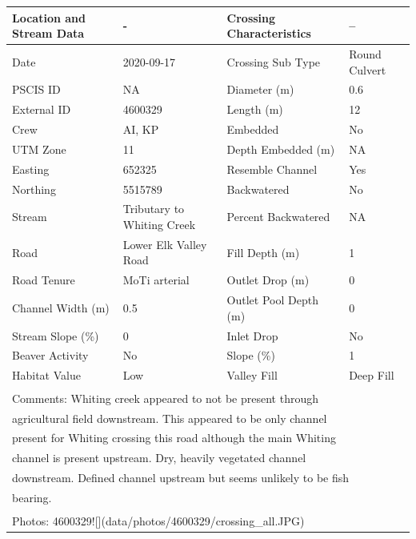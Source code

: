 \documentclass[
]{book}
\begin{document}
\begin{tabular}{l|l|l|l}
\hline
Location and Stream Data & - & Crossing Characteristics & --\\
\hline
Date & 2020-09-17 & Crossing Sub Type & Round Culvert\\
\hline
PSCIS ID & NA & Diameter (m) & 0.6\\
\hline
External ID & 4600329 & Length (m) & 12\\
\hline
Crew & AI, KP & Embedded & No\\
\hline
UTM Zone & 11 & Depth Embedded (m) & NA\\
\hline
Easting & 652325 & Resemble Channel & Yes\\
\hline
Northing & 5515789 & Backwatered & No\\
\hline
Stream & Tributary to Whiting Creek & Percent Backwatered & NA\\
\hline
Road & Lower Elk Valley Road & Fill Depth (m) & 1\\
\hline
Road Tenure & MoTi arterial & Outlet Drop (m) & 0\\
\hline
Channel Width (m) & 0.5 & Outlet Pool Depth (m) & 0\\
\hline
Stream Slope (\%) & 0 & Inlet Drop & No\\
\hline
Beaver Activity & No & Slope (\%) & 1\\
\hline
Habitat Value & Low & Valley Fill & Deep Fill\\
\hline
\multicolumn{4}{l}{\textsuperscript{} Comments: Whiting creek appeared to not be present through}\\
\multicolumn{4}{l}{agricultural field downstream. This appeared to be only channel}\\
\multicolumn{4}{l}{present for Whiting crossing this road although the main Whiting}\\
\multicolumn{4}{l}{channel is present upstream. Dry, heavily vegetated channel}\\
\multicolumn{4}{l}{downstream. Defined channel upstream but seems unlikely to be fish}\\
\multicolumn{4}{l}{bearing.}\\
\multicolumn{4}{l}{\textsuperscript{} Photos: 4600329![](data/photos/4600329/crossing\_all.JPG)}\\
\end{tabular}
\end{document}
